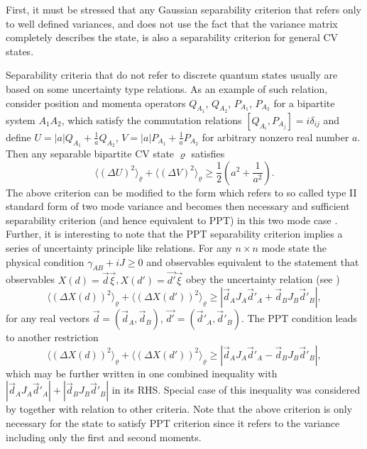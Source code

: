 \documentclass[twocolumn,aps,rmp]{revtex4}
\begin{document}
First, it must be stressed that any Gaussian separability criterion
that refers only to well defined variances, and does not use the fact
that the variance matrix completely describes the state, is also a
separability criterion for general CV states.

Separability criteria that do not refer to discrete quantum states
usually are based on some uncertainty type relations. As an example
of such relation, consider position and momenta operators
$Q_{A_{1}}$, $Q_{A_{2}}$, $P_{A_{1}}$, $P_{A_{2}}$ for a bipartite
system $A_{1}A_{2}$, which satisfy the commutation relations
$[Q_{A_{i}},P_{A_{j}}]=i\delta_{ij}$ and define
$U=|a|Q_{A_{1}}+\frac{1}{a}Q_{A_{2}}$,
$V=|a|P_{A_{1}}+\frac{1}{a}P_{A_{2}}$ for arbitrary nonzero real
number $a$. Then any separable bipartite CV state $\varrho$
satisfies \cite{DuanGCZ1999-criterion}
\begin{equation}
\langle (\Delta U)^{2} \rangle_{\varrho} + \langle (\Delta V)^{2} \rangle_{\varrho}
\geq \frac{1}{2}(a^{2} + \frac{1}{a^{2}}).
\end{equation}
The above criterion can be modified to the form which refers to so
called type II standard form of two mode variance and becomes then
necessary and sufficient separability criterion (and hence equivalent
to PPT) in this two mode case \cite{DuanGCZ1999-criterion}. Further,
it is interesting to note that the PPT separability criterion implies
a series of uncertainty principle like relations. For any $n\times n$
mode state the physical condition $\gamma_{AB} + iJ\geq 0$ and
observables equivalent to the statement that observables
$X(d)=\vec{d}\vec{\xi}$,\,$X(d')=\vec{d'}\vec{\xi}$ obey the
uncertainty relation (see \cite{Simon1})
\begin{equation}
\langle (\Delta X(d))^{2} \rangle_{\varrho} + \langle (\Delta X(d'))^{2} \rangle_{\varrho}
\geq |\vec{d}_{A}J_{A}\vec{d}'_{A} + \vec{d}_{B}J_{B}\vec{d}'_{B}|,
\end{equation}
for any real vectors $\vec{d}=(\vec{d}_{A},\vec{d}_{B})$,
$\vec{d'}=(\vec{d}'_{A},\vec{d}'_{B})$.
The PPT condition leads to another restriction \cite{Simon1}
\begin{equation}
\langle (\Delta X(d))^{2} \rangle_{\varrho} + \langle (\Delta X(d'))^{2} \rangle_{\varrho}
\geq |\vec{d}_{A}J_{A}\vec{d}'_{A} - \vec{d}_{B}J_{B}\vec{d}'_{B}|,
\end{equation}
which may be further  written in one combined inequality with
$|\vec{d}_{A}J_{A}\vec{d}'_{A}| +|\vec{d}_{B}J_{B}\vec{d}'_{B}|$ in
its RHS. Special case of this inequality was considered by
\cite{Giovannetti1} together with relation to other criteria.
Note that the above criterion is only necessary for the state to
satisfy PPT criterion since it refers to the variance including only the first
and second moments.
\end{document}
